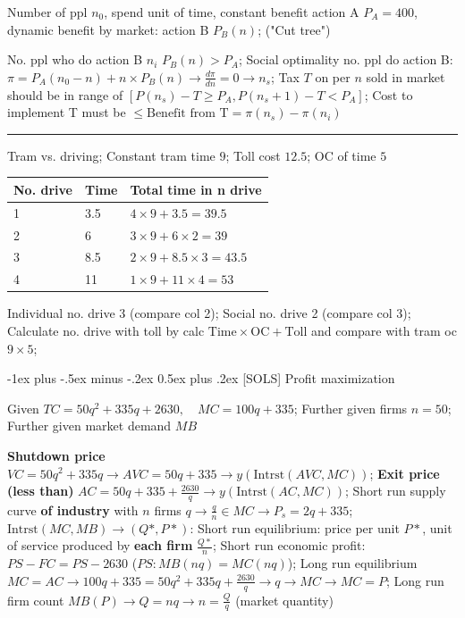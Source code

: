 \documentclass[a4paper]{article}
\makeatletter
\renewcommand{\section}{\@startsection{section}{1}{0mm}%
                                {-1ex plus -.5ex minus -.2ex}%
                                {0.5ex plus .2ex}%
                                {\normalfont\small\bfseries}}
\makeatother
\begin{document}
\begin{multicols*}{3}
    Number of ppl $n_0$, spend unit of time, constant benefit action A $P_A=400$, dynamic benefit by market: action B $P_B(n)$; ("Cut tree")

    No. ppl who do action B $n_i$ $P_B(n) > P_A$; Social optimality no. ppl do action B: $\pi = P_A(n_0-n) + n\times P_B(n) \to \frac{d\pi}{dn} = 0 \to n_s$; Tax $T$ on per $n$ sold in market should be in range of $[P(n_s) - T \geq P_A, P(n_s+1)-T < P_A]$; Cost to implement T must be $\leq \text{Benefit from T} = \pi(n_s) - \pi(n_i)$


    \rule{1\linewidth}{0.4pt}

    Tram vs. driving; Constant tram time $9$; Toll cost $12.5$; OC of time $5$

    \begin{tabular}{|l|l|l|}
        No. drive & Time & Total time in n drive        \\\hline
        1         & 3.5  & $4\times9+3.5 = 39.5$        \\
        2         & 6    & $3\times9+6\times2 = 39$     \\
        3         & 8.5  & $2\times9+8.5\times3 = 43.5$ \\
        4         & 11   & $1\times9+11\times4 = 53$    \\
    \end{tabular}

    Individual no. drive 3 (compare col 2); Social no. drive 2 (compare col 3); Calculate no. drive with toll by calc $\text{Time}\times\text{OC} + \text{Toll}$ and compare with tram oc $9\times5$;

    \section{[SOLS] Profit maximization}

    Given $TC=50q^2+335q+2630,\quad MC=100q+335$; Further given firms $n=50$; Further given market demand $MB$

    \textbf{Shutdown price} $VC = 50q^2+335q \to AVC = 50q + 335 \to y(\text{Intrst}(AVC,MC))$; \textbf{Exit price (less than)} $AC = 50q+335+\frac{2630}{q} \to y(\text{Intrst}(AC,MC))$; Short run supply curve \textbf{of industry} with $n$ firms $q\to \frac{q}{n} \in MC\to P_s=2q+335$;  $\text{Intrst}(MC,MB) \to (Q*,P*)$: Short run equilibrium: price per unit $P*$, unit of service produced by \textbf{each firm} $\frac{Q*}{n}$; Short run economic profit: $PS - FC = PS - 2630$ ($PS: MB(nq)=MC(nq)$); Long run equilibrium $MC=AC \to 100q+335 = 50q^2+335q+\frac{2630}{q} \to q \to MC \to MC = P$; Long run firm count $MB(P)\to Q = nq \to n = \frac{Q}{q}$ (market quantity)


\end{multicols*}
\end{document}
